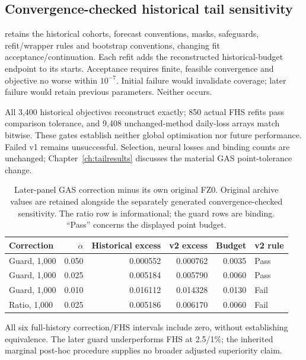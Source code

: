 \subsection{Convergence-checked historical tail sensitivity}
\label{sec:optimizer-sensitivity}

 retains the historical cohorts, forecast conventions, masks, safeguards, refit/wrapper rules and bootstrap conventions, changing fit acceptance/continuation. Each refit adds the reconstructed historical-budget endpoint to its starts. Acceptance requires finite, feasible convergence and objective no worse within $10^{-7}$. Initial failure would invalidate coverage; later failure would retain previous parameters. Neither occurs.

All 3,400 historical objectives reconstruct exactly; 850 actual FHS refits pass comparison tolerance, and 9,408 unchanged-method daily-loss arrays match bitwise. These gates establish neither global optimisation nor future performance. Failed v1 remains unsuccessful. Selection, neural losses and binding counts are unchanged; Chapter~\ref{ch:tailresults} discusses the material GAS point-tolerance change.

\begin{table}[htbp]
\centering\small
\caption[New optimiser sensitivity for GAS tolerances]{Later-panel GAS correction minus its own original FZ0. Original archive values are retained alongside the separately generated convergence-checked sensitivity. The ratio row is informational; the guard rows are binding. ``Pass'' concerns the displayed point budget.}
\label{tab:optimizer-gas-sensitivity}
\begin{tabular}{lrrrrl}
\toprule
Correction & $\alpha$ & Historical excess & v2 excess & Budget & v2 rule \\
\midrule
Guard, 1,000 & 0.050 & 0.000552 & 0.000762 & 0.0035 & Pass \\
Guard, 1,000 & 0.025 & 0.005184 & 0.005790 & 0.0060 & Pass \\
Guard, 1,000 & 0.010 & 0.016112 & 0.014328 & 0.0130 & Fail \\
Ratio, 1,000 & 0.025 & 0.005186 & 0.006170 & 0.0060 & Fail \\
\bottomrule
\end{tabular}
\end{table}

All six full-history correction/FHS intervals include zero, without establishing equivalence. The later guard underperforms FHS at 2.5/1\%; the inherited marginal post-hoc procedure supplies no broader adjusted superiority claim.

